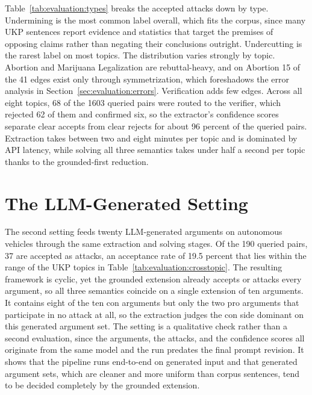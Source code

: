 \begin{table}[tb]
  \centering
  \caption{Composition of the accepted attacks per topic. ``Reb'', ``Und'', and
  ``Cut'' count edges labelled rebuttal, undermining, and undercutting,
  including symmetrized reverse edges. ``Sym'' is the number of edges added by
  rebuttal symmetrization and is contained in ``Reb''. ``Ver'' counts
  candidates that were accepted only after verification. ``Extract'' is the
  wall-clock extraction time in seconds. The three type counts per topic sum
  to the Acc column of Table~\ref{tab:evaluation:crosstopic}.}
  \label{tab:evaluation:types}
  
\end{table}

Table~\ref{tab:evaluation:types} breaks the accepted attacks down by type.
Undermining is the most common label overall, which fits the corpus, since many
UKP sentences report evidence and statistics that target the premises of
opposing claims rather than negating their conclusions outright. Undercutting
is the rarest label on most topics. The distribution varies strongly by topic.
Abortion and Marijuana Legalization are rebuttal-heavy, and on Abortion 15 of
the 41 edges exist only through symmetrization, which foreshadows the error
analysis in Section~\ref{sec:evaluation:errors}. Verification adds few edges.
Across all eight topics, 68 of the 1603 queried pairs were routed to the
verifier, which rejected 62 of them and confirmed six, so the extractor's
confidence scores separate clear accepts from
clear rejects for about 96 percent of the queried pairs. Extraction takes between
two and eight minutes per topic and is dominated by API latency, while solving
all three semantics takes under half a second per topic thanks to the
grounded-first reduction.

\section{The LLM-Generated Setting}
\label{sec:evaluation:llm}

The second setting feeds twenty LLM-generated arguments on autonomous vehicles
through the same extraction and solving stages. Of the 190 queried pairs, 37
are accepted as attacks, an acceptance rate of 19.5 percent that lies within
the range of the UKP topics in Table~\ref{tab:evaluation:crosstopic}. The
resulting framework is cyclic, yet the grounded extension already accepts or
attacks every argument, so all three semantics coincide on a single extension
of ten arguments. It contains eight of the ten con arguments but only the two
pro arguments that participate in no attack at all, so the extraction judges
the con side dominant on this generated argument set. The setting is a
qualitative check rather than a second evaluation, since the arguments, the
attacks, and the confidence scores all originate from the same model and the
run predates the final prompt revision. It shows that the pipeline runs
end-to-end on generated input and that generated argument sets, which are cleaner and
more uniform than corpus sentences, tend to be decided completely by the
grounded extension.

